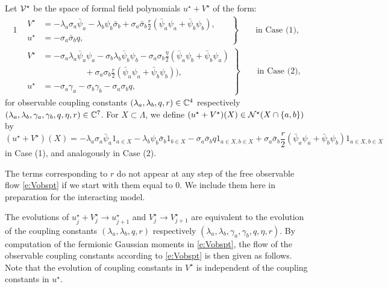\documentclass[11pt]{amsart}
\numberwithin{equation}{section}
\numberwithin{theorem}{section}
\newcommand{\1}{{\bf 1}}
\newcommand{\obs}{\star}
\newcommand{\Vobs}{V^\obs}
\newcommand{\uobs}{u^\obs}
\begin{document}
\begin{definition} \label{def:cVobs}
Let  $\cV^\obs$ be the space of formal field polynomials $u^\obs+\Vobs$ of the form:
  \begin{alignat}{1}
 &\left.\begin{aligned}
     \Vobs &=
    -  \lambda_a \sigma_a \bar\psi_a - \lambda_b \psi_b\bar\sigma_b
    + \sigma_a \bar\sigma_b\frac{r}{2}(\bar\psi_a\psi_a+\bar\psi_b\psi_b),
    \;\,\quad
    \\
   \nonumber u^\obs&= - { \sigma_a\bar\sigma_b }  q,
       \end{aligned}
 \right\} \qquad \text{in Case (1),}\\
 &  \left.\begin{aligned}
     \Vobs &=
    { -}\sigma_a \lambda_a\bar\psi_a\psi_a - \sigma_b\lambda_b\bar\psi_b\psi_b
    { -}\sigma_a\sigma_b\frac{\eta}{2} (\bar\psi_a\psi_b+\bar\psi_b\psi_a)
    \\
    & \nonumber \quad \quad  \quad \quad \quad
    + \sigma_a \sigma_b \frac{r}{2}(\bar\psi_a\psi_a+\bar\psi_b\psi_b)),\\
      \nonumber u^\obs&=- \sigma_a  \gamma_a- \sigma_b  \gamma_b-  { \sigma_a\sigma_b }  q ,
       \end{aligned}
 \right\} \qquad \text{in Case (2),}
  \end{alignat}
for observable coupling constants $(\lambda_{a},\lambda_{b},q, r)\in\mathbb{C}^{4}$
respectively $(\lambda_{a},\lambda_{b},\gamma_{a},\gamma_b,q,\eta, r)\in\mathbb{C}^{7}$.
 For $X \subset \Lambda$, we define $(u^{\obs}+\Vobs)(X) \in
 \cN^\obs(X \cap \{a,b\})$ by 
  \begin{equation} \label{e:VobsX}
    (u^\obs+\Vobs)(X) =
    -\lambda_a \sigma_a \bar\psi_a 1_{a\in X} -\lambda_b\psi_b
    \bar\sigma_b 1_{b \in X} 
    - \sigma_a  \bar\sigma_b q 1_{a\in X,b \in X}
    +\sigma_a  \bar\sigma_b \frac{r}{2}(\bar\psi_a\psi_a+\bar\psi_b\psi_b)1_{a\in X,b\in X}
  \end{equation}
  in Case (1), and analogously in Case (2).
\end{definition}

\begin{remark} The terms corresponding to $r$ do not appear at any
  step of the free observable flow \eqref{e:Vobspt} if we
  start with them equal to $0$.  We include them here in preparation
  for the interacting model.
\end{remark}
The evolutions of $\uobs_j+\Vobs_j \to u^{\obs}_{j+1}$ and $\Vobs_j \to \Vobs_{j+1}$ are equivalent to the evolution
of the coupling constants $(\lambda_a,\lambda_b,q, r)$ respectively
$(\lambda_a,\lambda_b,\gamma_a,\gamma_b,q,\eta,r)$.
By computation of the fermionic Gaussian moments in \eqref{e:Vobspt},
the flow of the observable coupling constants according to
\eqref{e:Vobspt} is then given as follows. Note 
that the evolution of coupling constants in $\Vobs$ is independent
  of the coupling constants in $u^\obs$.
\end{document}
